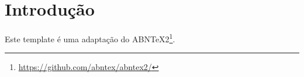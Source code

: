 \section{Introdução}


Este template é uma adaptação do ABNTeX2\footnote{\url{https://github.com/abntex/abntex2/}}.
